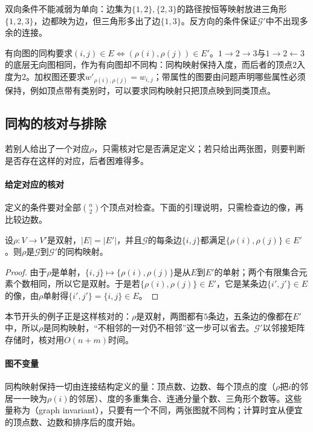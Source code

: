 双向条件不能减弱为单向：边集为$\{1,2\},\{2,3\}$的路径按恒等映射放进三角形$\{1,2,3\}$，边都映为边，但三角形多出了边$\{1,3\}$。反方向的条件保证$\mathcal G'$中不出现多余的连接。

有向图的同构要求$(i,j)\in E\iff(\rho(i),\rho(j))\in E'$。$1\to2\to3$与$1\to2\leftarrow3$的底层无向图相同，作为有向图却不同构：同构映射保持入度，而后者的顶点$2$入度为$2$。加权图还要求$w'_{\rho(i),\rho(j)}=w_{i,j}$；带属性的图要由问题声明哪些属性必须保持，例如顶点带有类别时，可以要求同构映射只把顶点映到同类顶点。

\subsection{同构的核对与排除}
\label{sec:graph-conn-isomorphism-checking}

若别人给出了一个对应$\rho$，只需核对它是否满足定义；若只给出两张图，则要判断是否存在这样的对应，后者困难得多。

\paragraph{给定对应的核对}
定义的条件要对全部$\binom n2$个顶点对检查。下面的引理说明，只需检查边的像，再比较边数。

\begin{lemma}[同构映射的核对]
\label{lem:graph-conn-isomorphism-check}
设$\rho:V\to V'$是双射，$|E|=|E'|$，并且$\mathcal G$的每条边$\{i,j\}$都满足$\{\rho(i),\rho(j)\}\in E'$。则$\rho$是$\mathcal G$到$\mathcal G'$的同构映射。
\end{lemma}

\begin{proof}
由于$\rho$是单射，$\{i,j\}\mapsto\{\rho(i),\rho(j)\}$是从$E$到$E'$的单射；两个有限集合元素个数相同，所以它是双射。于是若$\{\rho(i),\rho(j)\}\in E'$，它是某条边$\{i',j'\}\in E$的像，由$\rho$单射得$\{i',j'\}=\{i,j\}\in E$。
\end{proof}

本节开头的例子正是这样核对的：$\rho$是双射，两图都有$5$条边，五条边的像都在$E'$中，所以$\rho$是同构映射，“不相邻的一对仍不相邻”这一步可以省去。$\mathcal G'$以邻接矩阵存储时，核对用$O(n+m)$时间。

\paragraph{图不变量}
同构映射保持一切由连接结构定义的量：顶点数、边数、每个顶点的度（$\rho$把$i$的邻居一一映为$\rho(i)$的邻居）、度的多重集合、连通分量个数、三角形个数等。这些量称为（graph invariant），只要有一个不同，两张图就不同构；计算时宜从便宜的顶点数、边数和排序后的度开始。

